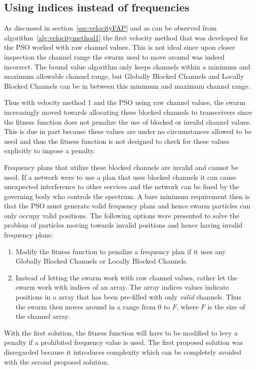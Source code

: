 \subsection{Using indices instead of frequencies}
\label{sec:velocityFAP2}
As discussed in section~\ref{sec:velocityFAP} and as can be observed from algorithm~\ref{alg:velocitymethod1} the first velocity method that was developed for the PSO worked with raw channel values. This is not ideal since upon closer inspection the channel range the swarm used to move around was indeed incorrect. The bound value algorithm only keeps channels within a minimum and maximum allowable channel range, but Globally Blocked Channels and Locally Blocked Channels can be in between this minimum and maximum channel range. 

Thus with velocity method 1 and the PSO using raw channel values, the swarm increasingly moved towards allocating these blocked channels to transceivers since the fitness function does not penalize the use of blocked or invalid channel values. This is due in part because these values are under no circumstances allowed to be used and thus the fitness function is not designed to check for these values explicitly to impose a penalty.

Frequency plans that utilize these blocked channels are invalid and cannot be used. If a network were to use a plan that uses blocked channels it can cause unexpected interference to other services and the network can be fined by the governing body who controls the spectrum. A bare minimum requirement then is that the PSO must generate valid frequency plans and hence swarm particles can only occupy valid positions. The following options were presented to solve the problem of particles moving towards invalid positions and hence having invalid frequency plans:
\begin{enumerate}
\item Modify the fitness function to penalize a frequency plan if it uses any Globally Blocked Channels or Locally Blocked Channels.
\item Instead of letting the swarm work with raw channel values, rather let the swarm work with indices of an array. The array indices values indicate positions in a array that has been pre-filled with only \emph{valid} channels. Thus the swarm then moves around in a range from 0 to $F$, where $F$ is the size of the channel array.
\end{enumerate}

With the first solution, the fitness function will have to be modified to levy a penalty if a prohibited frequency value is used. The first proposed solution was disregarded because it introduces complexity which can be completely avoided with the second proposed solution.

